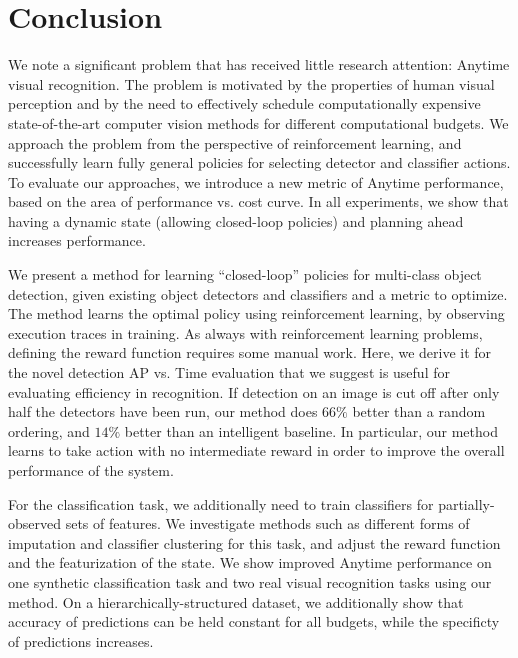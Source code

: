 \chapter{Conclusion}\label{sec:conclusion}

We note a significant problem that has received little research attention: Anytime visual recognition.
The problem is motivated by the properties of human visual perception and by the need to effectively schedule computationally expensive state-of-the-art computer vision methods for different computational budgets.
We approach the problem from the perspective of reinforcement learning, and successfully learn fully general policies for selecting detector and classifier actions.
To evaluate our approaches, we introduce a new metric of Anytime performance, based on the area of performance vs. cost curve.
In all experiments, we show that having a dynamic state (allowing closed-loop policies) and planning ahead increases performance.

We present a method for learning ``closed-loop'' policies for multi-class object detection, given existing object detectors and classifiers and a metric to optimize.
The method learns the optimal policy using reinforcement learning, by observing execution traces in training.
As always with reinforcement learning problems, defining the reward function requires some manual work.
Here, we derive it for the novel detection AP vs. Time evaluation that we suggest is useful for evaluating efficiency in recognition.
If detection on an image is cut off after only half the detectors have been run, our method does $66\%$ better than a random ordering, and $14\%$ better than an intelligent baseline.
In particular, our method learns to take action with no intermediate reward in order to improve the overall performance of the system.

For the classification task, we additionally need to train classifiers for partially-observed sets of features.
We investigate methods such as different forms of imputation and classifier clustering for this task, and adjust the reward function and the featurization of the state.
We show improved Anytime performance on one synthetic classification task and two real visual recognition tasks using our method.
On a hierarchically-structured dataset, we additionally show that accuracy of predictions can be held constant for all budgets, while the specificty of predictions increases.

